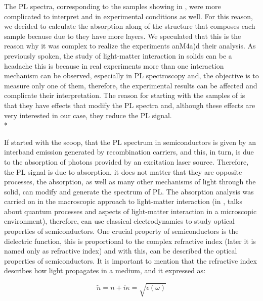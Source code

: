 The PL spectra, corresponding to the samples showing in ,  were more complicated to interpret and in experimental conditions as well. For this reason, we decided to calculate the absorption along of the structure that composes each sample because due to they have more layers. We speculated that this is the reason why it was complex to realize the experiments anM4a)d their analysis. As previously spoken, the study of light-matter interaction in solids can be a headache this is because in real experiments more than one interaction mechanism can be observed, especially in PL spectroscopy and, the objective is to measure only one of them, therefore, the experimental results can be affected and complicate their interpretation. The reason for starting with the samples of  is that they have effects that modify the PL spectra and, although these effects are very interested in our case, they reduce the PL signal.\\* 


If started with the scoop, that the PL spectrum in semiconductors is given by an interband emission generated by recombination carriers, and this, in turn, is due to the absorption of photons provided by an excitation laser source. Therefore, the PL signal is due to absorption, it does not matter that they are opposite processes, the absorption, as well as many other mechanisms of light through the solid, can modify and generate the spectrum of PL. The absorption analysis was carried on in the macroscopic approach to light-matter interaction (in , talks about quantum processes and aspects of light-matter interaction in a microscopic environment), therefore,   can use classical electrodynamics to study optical properties of semiconductors. One crucial property of semiconductors is the dielectric function, this is proportional to the complex refractive index (later it is named only as refractive index) and with this,  can be described the optical properties of semiconductors. It is important to mention that the refractive index describes how light propagates  in a medium, and it expressed as\cite{chuang2012physics,jimenez2016spectroscopic}:

\begin{equation}
	\tilde{n}=n + i\kappa = \sqrt{\epsilon(\omega)}
	\label{eq:chapter-3-PL-complex-refractive-index}
\end{equation}

